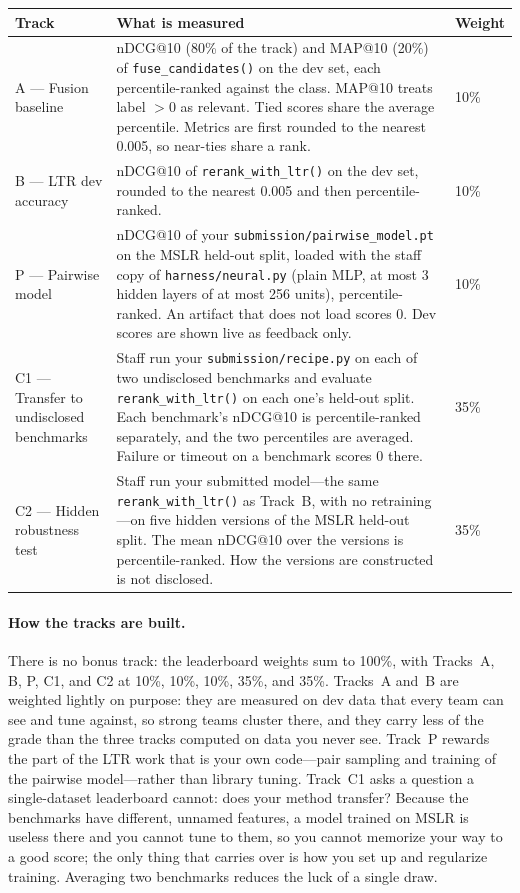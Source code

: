 \documentclass[10pt]{article}
\begin{document}
\begin{center}
\begin{tabular}{|p{3.4cm}|p{8.6cm}|p{1.5cm}|}
\hline
\textbf{Track} & \textbf{What is measured} & \textbf{Weight}\\
\hline
A --- Fusion baseline &
nDCG@10 (80\% of the track) and MAP@10 (20\%) of \texttt{fuse\_candidates()} on the dev set, each percentile-ranked against the class. MAP@10 treats label \(> 0\) as relevant. Tied scores share the average percentile. Metrics are first rounded to the nearest 0.005, so near-ties share a rank. &
10\%\\
\hline
B --- LTR dev accuracy &
nDCG@10 of \texttt{rerank\_with\_ltr()} on the dev set, rounded to the nearest 0.005 and then percentile-ranked. &
10\%\\
\hline
P --- Pairwise model &
nDCG@10 of your \texttt{submission/pairwise\_model.pt} on the MSLR held-out split, loaded with the staff copy of \texttt{harness/neural.py} (plain MLP, at most 3 hidden layers of at most 256 units), percentile-ranked. An artifact that does not load scores 0. Dev scores are shown live as feedback only. &
10\%\\
\hline
C1 --- Transfer to undisclosed benchmarks &
Staff run your \texttt{submission/recipe.py} on each of two undisclosed benchmarks and evaluate \texttt{rerank\_with\_ltr()} on each one's held-out split. Each benchmark's nDCG@10 is percentile-ranked separately, and the two percentiles are averaged. Failure or timeout on a benchmark scores 0 there. &
35\%\\
\hline
C2 --- Hidden robustness test &
Staff run your submitted model---the same \texttt{rerank\_with\_ltr()} as Track~B, with no retraining---on five hidden versions of the MSLR held-out split. The mean nDCG@10 over the versions is percentile-ranked. How the versions are constructed is not disclosed. &
35\%\\
\hline
\end{tabular}
\end{center}

\paragraph{How the tracks are built.}
There is no bonus track: the leaderboard weights sum to 100\%, with Tracks~A, B, P, C1, and C2 at 10\%, 10\%, 10\%, 35\%, and 35\%. Tracks~A and~B are weighted lightly on purpose: they are measured on dev data that every team can see and tune against, so strong teams cluster there, and they carry less of the grade than the three tracks computed on data you never see. Track~P rewards the part of the LTR work that is your own code---pair sampling and training of the pairwise model---rather than library tuning. Track~C1 asks a question a single-dataset leaderboard cannot: does your method transfer? Because the benchmarks have different, unnamed features, a model trained on MSLR is useless there and you cannot tune to them, so you cannot memorize your way to a good score; the only thing that carries over is how you set up and regularize training. Averaging two benchmarks reduces the luck of a single draw.
\end{document}
